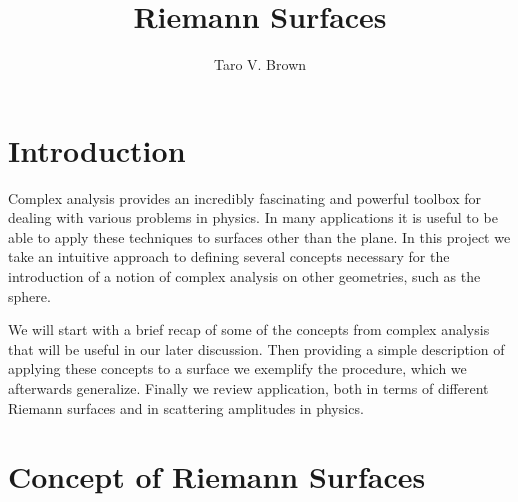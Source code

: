\documentclass[lettersize,12pt]{article}
\title{Riemann Surfaces}
\author[a]{Taro V. Brown}
\affiliation[a]{Department of Physics, UC Davis, One Shields Avenue, Davis, CA 95616, USA }
\begin{document}
 
\maketitle
\flushbottom
\newpage
\section{Introduction}
Complex analysis provides an incredibly fascinating and powerful toolbox for dealing with various problems in physics. In many applications it is useful to be able to apply these techniques to surfaces other than the plane. In this project we take an intuitive approach to defining several concepts necessary for the introduction of a notion of complex analysis on other geometries, such as the sphere. 

We will start with a brief recap of some of the concepts from complex analysis that will be useful in our later discussion. Then providing a simple description of applying these concepts to a surface we exemplify the procedure, which we afterwards generalize. Finally we review application, both in terms of different Riemann surfaces and in scattering amplitudes in physics.
\section{Concept of Riemann Surfaces}
\end{document}
